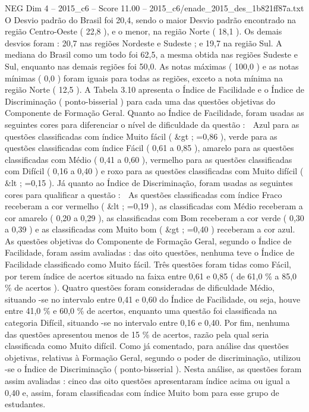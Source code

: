 \begin{textsample}{NEG Dim 4 – 2015\_c6 – Score 11.00 – 2015\_c6/enade\_2015\_des\_1b821ff87a.txt}
O Desvio padrão do Brasil foi 20,4, sendo o maior Desvio padrão encontrado na região Centro-Oeste ( 22,8 ), e o menor, na região Norte ( 18,1 ).
Os demais desvios foram : 20,7 nas regiões Nordeste e Sudeste ; e 19,7 na região Sul.
A mediana do Brasil como um todo foi 62,5, a mesma obtida nas regiões Sudeste e Sul, enquanto nas demais regiões foi 50,0.
As notas máximas ( 100,0 ) e as notas mínimas ( 0,0 ) foram iguais para todas as regiões, exceto a nota mínima na região Norte ( 12,5 ).
A Tabela 3.10 apresenta o Índice de Facilidade e o Índice de Discriminação ( ponto-bisserial ) para cada uma das questões objetivas do Componente de Formação Geral.
Quanto ao Índice de Facilidade, foram usadas as seguintes cores para diferenciar o nível de dificuldade da questão :  Azul para as questões classificadas com índice Muito fácil ( \&gt ; =0,86 ), verde para as questões classificadas com índice Fácil ( 0,61 a 0,85 ), amarelo para as questões classificadas com Médio ( 0,41 a 0,60 ), vermelho para as questões classificadas com Difícil ( 0,16 a 0,40 ) e roxo para as questões classificadas com Muito difícil ( \&lt ; =0,15 ).
Já quanto ao Índice de Discriminação, foram usadas as seguintes cores para qualificar a questão :  As questões classificadas com índice Fraco receberam a cor vermelho ( \&lt ; =0,19 ), as classificadas com Médio receberam a cor amarelo ( 0,20 a 0,29 ), as classificadas com Bom receberam a cor verde ( 0,30 a 0,39 ) e as classificadas com Muito bom ( \&gt ; =0,40 ) receberam a cor azul.
As questões objetivas do Componente de Formação Geral, segundo o Índice de Facilidade, foram assim avaliadas : das oito questões, nenhuma teve o Índice de Facilidade classificado como Muito fácil.
Três questões foram tidas como Fácil, por terem índice de acertos situado na faixa entre 0,61 e 0,85 ( de 61,0 \% a 85,0 \% de acertos ).
Quatro questões foram consideradas de dificuldade Médio, situando -se no intervalo entre 0,41 e 0,60 do Índice de Facilidade, ou seja, houve entre 41,0 \% e 60,0 \% de acertos, enquanto uma questão foi classificada na categoria Difícil, situando -se no intervalo entre 0,16 e 0,40.
Por fim, nenhuma das questões apresentou menos de 15 \% de acertos, razão pela qual seria classificada como Muito difícil.
Como já comentado, para análise das questões objetivas, relativas à Formação Geral, segundo o poder de discriminação, utilizou -se o Índice de Discriminação ( ponto-bisserial ).
Nesta análise, as questões foram assim avaliadas : cinco das oito questões apresentaram índice acima ou igual a 0,40 e, assim, foram classificadas com índice Muito bom para esse grupo de estudantes.

\end{textsample}
